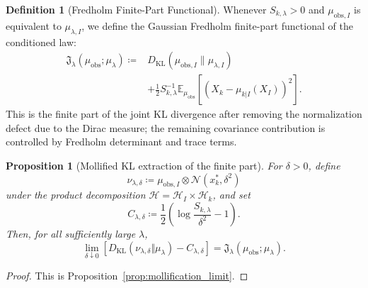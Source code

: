 \documentclass[preprint,12pt]{elsarticle}
\theoremstyle{plain}
\newtheorem{proposition}[theorem]{Proposition}
\theoremstyle{definition}
\newtheorem{definition}[theorem]{Definition}
\theoremstyle{remark}
\newcommand{\KL}{D_{\operatorname{KL}}}
\newcommand{\E}{\mathbb{E}}
\begin{document}
    \begin{definition}[Fredholm Finite-Part Functional]
        \label{def:unified_action}
        Whenever $S_{k,\lambda}>0$ and $\mu_{\text{obs},I}$ is equivalent to $\mu_{\lambda,I}$, we define the Gaussian Fredholm finite-part functional of the conditioned law:
        \begin{equation}
            \label{eq:unified_action}
            \begin{aligned}
                \mathfrak{J}_\lambda(\mu_{\mathrm{obs}}; \mu_\lambda) \coloneqq &\KL(\mu_{\mathrm{obs},I} \parallel \mu_{\lambda,I}) \\
                &+ \frac{1}{2} S_{k,\lambda}^{-1} \E_{\mu_{\mathrm{obs}}}\left[ \left( X_k - \mu_{k|I}(X_I) \right)^2 \right].
            \end{aligned}
        \end{equation}
        This is the finite part of the joint KL divergence after removing the normalization defect due to the Dirac measure; the remaining covariance contribution is controlled by Fredholm determinant and trace terms.
    \end{definition}

    \begin{proposition}[Mollified KL extraction of the finite part]
        \label{prop:mollified_kl_extraction_main}
        For $\delta>0$, define
        \[
            \nu_{\lambda,\delta}
            \coloneqq
            \mu_{\mathrm{obs},I}\otimes \mathcal{N}(x_k^*,\delta^2)
        \]
        under the product decomposition
        $\mathcal{H}=\mathcal{H}_I\times\mathcal{H}_k$, and set
        \[
            C_{\lambda,\delta}
            \coloneqq
            \frac12\left(\log\frac{S_{k,\lambda}}{\delta^2}-1\right).
        \]
        Then, for all sufficiently large $\lambda$,
        \begin{equation}
            \lim_{\delta\downarrow0}
            \left[
                \KL(\nu_{\lambda,\delta}\Vert\mu_\lambda)
                -C_{\lambda,\delta}
            \right]
            =
            \mathfrak{J}_\lambda(\mu_{\mathrm{obs}};\mu_\lambda).
        \end{equation}
    \end{proposition}
    \begin{proof}
        This is Proposition~\ref{prop:mollification_limit}.
    \end{proof}
\end{document}
